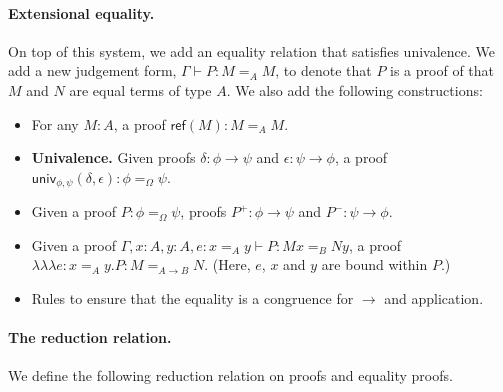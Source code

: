 \documentclass{easychair}
\newcommand{\univ}[4]{\mathsf{univ}_{{#1},{#2}} \left( {#3} , {#4} \right)}
\newcommand{\triplelambda}{\lambda \!\! \lambda \!\! \lambda}
\newcommand{\reff}[1]{\mathsf{ref} \left( {#1} \right)}
\begin{document}
\paragraph{Extensional equality.}

On top of this system, we add an equality relation that satisfies univalence.  We add a new judgement form,
$\Gamma \vdash P : M =_A M$, to denote that $P$ is a proof of that $M$ and $N$ are equal terms of type $A$.  We also add the following constructions:
\begin{itemize}
\item
For any $M : A$, a proof $\reff{M} : M =_A M$.
\item
\textbf{Univalence.}  Given proofs $\delta : \phi \rightarrow \psi$ and $\epsilon : \psi \rightarrow \phi$, a proof
$\univ{\phi}{\psi}{\delta}{\epsilon} : \phi =_\Omega \psi$.
\item
Given a proof $P : \phi =_\Omega \psi$, proofs $P^+ : \phi \rightarrow \psi$ and $P^- : \psi \rightarrow \phi$.
\item
Given a proof $\Gamma, x : A, y : A, e : x =_A y \vdash P : Mx =_B Ny$, a proof \\ $\triplelambda e : x=_Ay . P : M =_{A \rightarrow B} N$.  (Here, $e$, $x$ and $y$ are bound within $P$.)
\item
Rules to ensure that the equality is a congruence for $\rightarrow$ and application.
\end{itemize}

\paragraph{The reduction relation.}

We define the following reduction relation on proofs and equality proofs.
\end{document}

